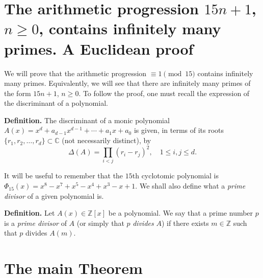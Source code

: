 \documentclass[a4paper, 12pt]{article}
\theoremstyle{definition}
\newcommand{\Z}{\mathbb{Z}}
\newcommand{\C}{\mathbb{C}}
\renewcommand\title{\textbf{The arithmetic progression $15n+1$, $n\geqslant0$, contains infinitely many primes.\\ A Euclidean proof}}
\begin{document}
\thispagestyle{plain}
\sloppy
\section{The arithmetic progression $15n+1$, $n\geqslant0$, contains infinitely many primes. A Euclidean proof}

We will prove that the arithmetic progression $\equiv 1 \pmod{15}$ contains infinitely many primes. Equivalently, we will see that there are infinitely many primes of the form $15n+1$, $n\geqslant0$. To follow the proof, one must recall the expression of the discriminant of a polynomial. 

\textbf{Definition.} The discriminant of a monic polynomial $A(x)=x^d+a_{d-1}x^{d-1}+\cdots+a_1x+a_0$ is given, in terms of its roots $\{r_1,r_2,\dots,r_d\}\subset\C$ (not necessarily distinct), by
\begin{equation}\label{eq:discrim}
	\Delta(A)=\prod_{i<j}(r_i-r_j)^2, \quad 1\leqslant i,j\leqslant d.
\end{equation}

It will be useful to remember that the $15$th cyclotomic polynomial is $\Phi_{15}(x)=x^{8} - x^{7} + x^{5} - x^{4} + x^{3} - x + 1$. We shall also define what a \emph{prime divisor} of a given polynomial is.

\textbf{Definition.} Let $A(x)\in\Z[x]$ be a polynomial. We say that a prime number $p$ is a \emph{prime divisor} of $A$ (or simply that $p$ \emph{divides} $A$) if there exists $m\in\Z$ such that $p$ divides $A(m)$.

\section{The main Theorem}\label{sec:mainTh}
\end{document}
